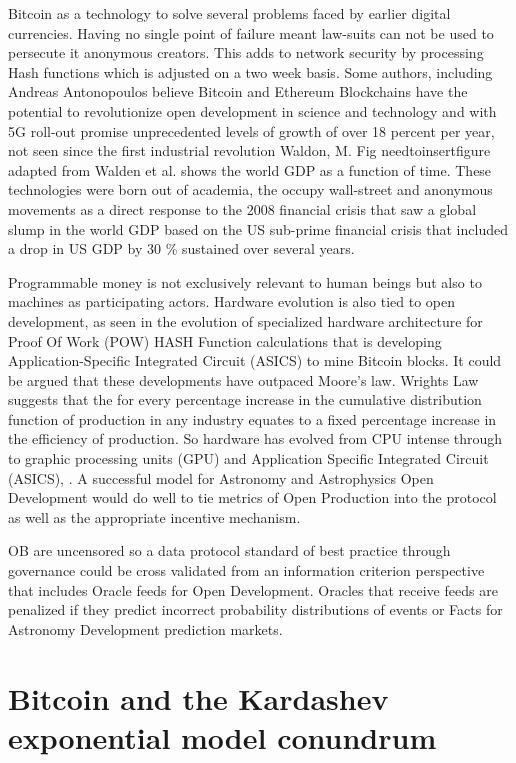 \documentclass[final,5p,times,twocolumn,authoryear]{elsarticle}
\begin{document}
Bitcoin as a technology to solve several problems faced by earlier digital currencies. Having no single point of failure meant law-suits can not be used to persecute it anonymous creators. This adds to network security by processing Hash functions which is adjusted on a two week basis. Some authors, including Andreas Antonopoulos believe Bitcoin and Ethereum Blockchains have the potential to revolutionize open development in science and technology and with 5G roll-out promise unprecedented levels of growth of over 18 percent per year, not seen since the first industrial revolution Waldon, M.  Fig needtoinsertfigure adapted from Walden et al. shows the world GDP as a function of time. These technologies were born out of academia, the occupy wall-street and anonymous movements as a direct response to the 2008 financial crisis that saw a global slump in the world GDP based on the US sub-prime financial crisis  that included a drop in US GDP by 30 \% sustained over several years.
 
Programmable money is not exclusively relevant to human beings but also to machines as participating actors. Hardware evolution is also tied to open development, as seen in the evolution of specialized hardware architecture for Proof Of Work (POW) HASH Function calculations that is developing Application-Specific Integrated Circuit (ASICS) to mine Bitcoin blocks. It could be argued that these developments have outpaced Moore's law.  Wrights Law suggests that the for every percentage increase in the cumulative distribution function of production in any industry equates to a fixed percentage increase in the efficiency of production. So hardware has evolved from CPU intense through to graphic processing units (GPU) and  Application Specific Integrated Circuit  (ASICS), \cite{10.1371/journal.pone.0052669}. A successful model for Astronomy and Astrophysics Open Development would do well to tie metrics of Open Production into the protocol as well as the appropriate incentive mechanism.       

OB are uncensored so a data protocol standard of best practice through governance could be cross validated from an information criterion perspective that includes Oracle feeds for Open Development.  Oracles that receive feeds are penalized if they predict incorrect probability distributions of events or Facts for Astronomy Development prediction markets. 

\section{Bitcoin and the Kardashev exponential model conundrum}
\label{sec:energy}
\end{document}
